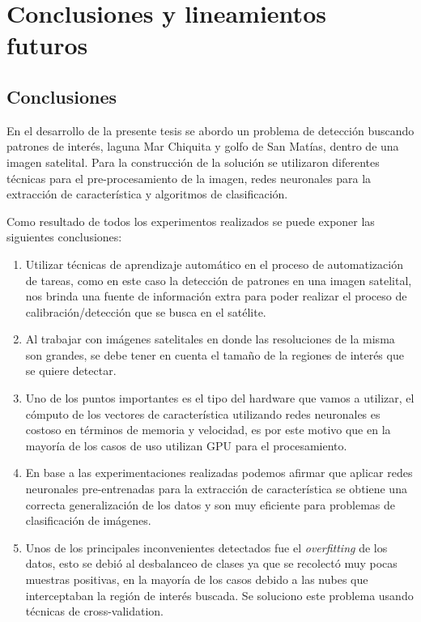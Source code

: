 \chapter{Conclusiones y lineamientos futuros}\label{chap:conclusiones}


\section{Conclusiones}
En el desarrollo de la presente tesis se abordo un problema de detección buscando patrones de interés, laguna Mar Chiquita y golfo de San Matías, dentro de una imagen satelital. Para la construcción de la solución se utilizaron diferentes técnicas para el pre-procesamiento de la imagen, redes neuronales para la extracción de característica y algoritmos de clasificación. 

Como resultado de todos los experimentos realizados se puede exponer las siguientes conclusiones:

\begin{enumerate}
\item Utilizar técnicas de aprendizaje automático en el proceso de automatización de tareas, como en este caso la detección de patrones en una imagen satelital, nos brinda una fuente de información extra para poder realizar el proceso de calibración/detección que se busca en el satélite. 

\item Al trabajar con imágenes satelitales en donde las resoluciones de la misma son grandes, se debe tener en cuenta el tamaño de la regiones de interés que se quiere detectar.

\item Uno de los puntos importantes es el tipo del hardware que vamos a utilizar, el cómputo de los vectores de característica utilizando redes neuronales es costoso en términos de memoria y velocidad, es por este motivo que en la mayoría de los casos de uso utilizan GPU para el procesamiento.

\item En base a las experimentaciones realizadas podemos afirmar que aplicar redes neuronales pre-entrenadas para la extracción de característica se obtiene una correcta generalización de los datos y son muy eficiente para problemas de clasificación de imágenes.

\item Unos de los principales inconvenientes detectados fue el \textit{overfitting} de los datos, esto se debió al desbalanceo de clases ya que se recolectó muy pocas muestras positivas, en la mayoría de los casos debido a las nubes que interceptaban la región de interés buscada. Se soluciono este problema usando técnicas de cross-validation.

\end{enumerate}

